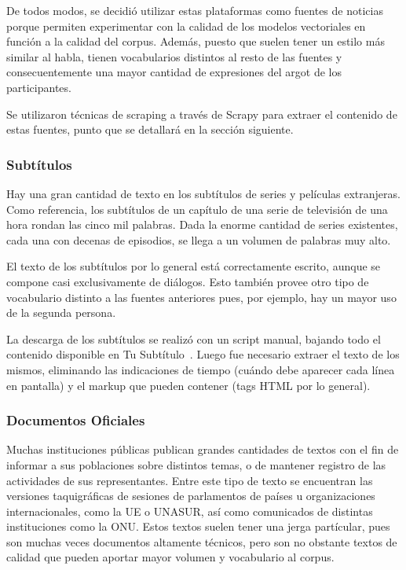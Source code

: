 De todos modos, se decidió utilizar estas plataformas como fuentes de noticias porque permiten
experimentar con la calidad de los modelos vectoriales en función a la calidad del corpus. Además,
puesto que suelen tener un estilo más similar al habla, tienen vocabularios distintos al resto de
las fuentes y consecuentemente una mayor cantidad de expresiones del argot de los participantes.

Se utilizaron técnicas de scraping a través de Scrapy para extraer el contenido de estas fuentes,
punto que se detallará en la sección siguiente.


\subsubsection{Subtítulos}

Hay una gran cantidad de texto en los subtítulos de series y películas extranjeras. Como referencia,
los subtítulos de un capítulo de una serie de televisión de una hora rondan las cinco mil
palabras. Dada la enorme cantidad de series existentes, cada una con decenas de episodios, se llega
a un volumen de palabras muy alto.

El texto de los subtítulos por lo general está correctamente escrito, aunque se compone casi
exclusivamente de diálogos. Esto también provee otro tipo de vocabulario distinto a las fuentes
anteriores pues, por ejemplo, hay un mayor uso de la segunda persona.

La descarga de los subtítulos se realizó con un script manual, bajando todo el contenido disponible
en Tu Subtítulo~\cite{TuSubtitulo}. Luego fue necesario extraer el texto de los mismos, eliminando
las indicaciones de tiempo (cuándo debe aparecer cada línea en pantalla) y el markup que pueden
contener (tags HTML por lo general).


\subsubsection{Documentos Oficiales}

Muchas instituciones públicas publican grandes cantidades de textos con el fin de informar a sus
poblaciones sobre distintos temas, o de mantener registro de las actividades de sus
representantes. Entre este tipo de texto se encuentran las versiones taquigráficas de sesiones de
parlamentos de países u organizaciones internacionales, como la UE o UNASUR, así como comunicados de
distintas instituciones como la ONU\@. Estos textos suelen tener una jerga partícular, pues son
muchas veces documentos altamente técnicos, pero son no obstante textos de calidad que pueden
aportar mayor volumen y vocabulario al corpus.

